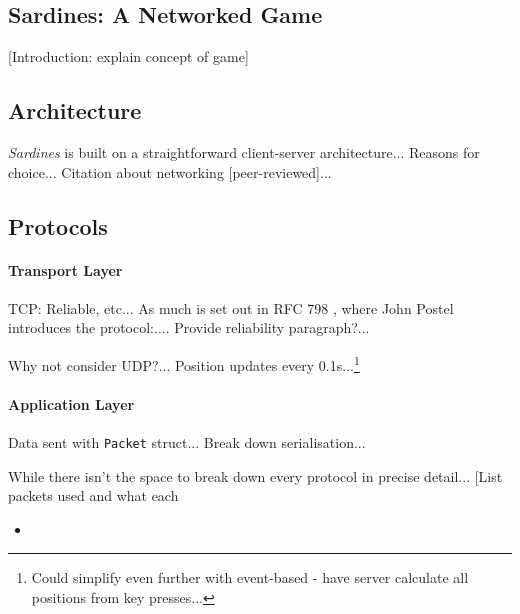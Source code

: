 \documentclass[a4paper, 11pt]{article}
\begin{document}
\graphicspath{{./Images/}}
\begin{flushleft}

\section*{Sardines: A Networked Game}

[Introduction: explain concept of game]

\subsection*{Architecture}

\textit{Sardines} is built on a straightforward client-server architecture...
Reasons for choice...
Citation about networking [peer-reviewed]...

\vspace{5pt}


\subsection*{Protocols}

\paragraph{Transport Layer}

TCP: Reliable, etc...
As much is set out in RFC 798 %
, where John Postel introduces the protocol:.... %
Provide reliability paragraph?...

\vspace{5pt}\noindent
Why not consider UDP?...
Position updates every 0.1s...\footnote{Could simplify even further with event-based - have server calculate all positions from key presses...}

\paragraph{Application Layer}

Data sent with \texttt{Packet} struct...
Break down serialisation...

\vspace{5pt}\noindent
While there isn't the space to break down every protocol in precise detail... [List packets used and what each 
\begin{itemize}
\item
\end{itemize}


\end{flushleft}
\end{document}
